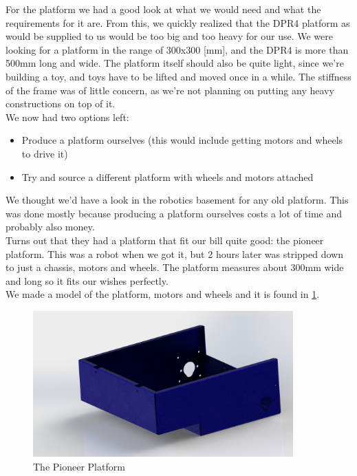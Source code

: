 \documentclass[11pt,twoside,a4paper]{report}
\begin{document}
For the platform we had a good look at what we would need and what the requirements for it are. From this, we quickly realized that the DPR4 platform as would be supplied to us would be too big and too heavy for our use. We were looking for a platform in the range of 300x300 [mm], and the DPR4 is more than 500mm long and wide. The platform itself should also be quite light, since we\rq{}re building a toy, and toys have to be lifted and moved once in a while. The stiffness of the frame was of little concern, as we\rq{}re not planning on putting any heavy constructions on top of it. \\
We now had two options left:
\begin{itemize}
\item Produce a platform ourselves (this would include getting motors and wheels to drive it)
\item Try and source a different platform with wheels and motors attached
\end{itemize}
We thought we\rq{}d have a look in the robotics basement for any old platform. This was done mostly because producing a platform ourselves costs a lot of time and probably also money.\\
Turns out that they had a platform that fit our bill quite good: the pioneer platform. This was a robot when we got it, but 2 hours later was stripped down to just a chassis, motors and wheels. The platform measures about 300mm wide and long so it fits our wishes perfectly.\\
We made a model of the platform, motors and wheels and it is found in \ref{fig:pionplat}. \\

\begin{figure}[H]
\begin{center}
\includegraphics[width = 10cm]{Images/doosje.jpg}
\caption{The Pioneer Platform}
\label{fig:pionplat}
\end{center}
\end{figure}
\end{document}
